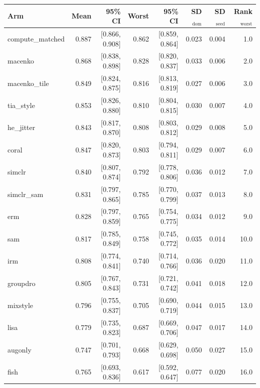 \begin{tabular}{lrrrrrrr}
\toprule
Arm & Mean & 95\% CI & Worst & 95\% CI & SD$_\text{dom}$ & SD$_\text{seed}$ & Rank$_\text{worst}$ \\
\midrule
compute\_matched & 0.887 & [0.866, 0.908] & 0.862 & [0.859, 0.864] & 0.023 & 0.004 & 1.0 \\
macenko & 0.868 & [0.838, 0.898] & 0.828 & [0.820, 0.837] & 0.033 & 0.006 & 2.0 \\
macenko\_tile & 0.849 & [0.824, 0.875] & 0.816 & [0.813, 0.819] & 0.027 & 0.006 & 3.0 \\
tia\_style & 0.853 & [0.826, 0.880] & 0.810 & [0.804, 0.815] & 0.030 & 0.007 & 4.0 \\
he\_jitter & 0.843 & [0.817, 0.870] & 0.808 & [0.803, 0.812] & 0.029 & 0.008 & 5.0 \\
coral & 0.847 & [0.820, 0.873] & 0.803 & [0.794, 0.811] & 0.029 & 0.007 & 6.0 \\
simclr & 0.840 & [0.807, 0.874] & 0.792 & [0.778, 0.806] & 0.036 & 0.012 & 7.0 \\
simclr\_sam & 0.831 & [0.797, 0.865] & 0.785 & [0.770, 0.799] & 0.037 & 0.013 & 8.0 \\
erm & 0.828 & [0.797, 0.859] & 0.765 & [0.754, 0.775] & 0.034 & 0.012 & 9.0 \\
sam & 0.817 & [0.785, 0.849] & 0.758 & [0.745, 0.772] & 0.035 & 0.014 & 10.0 \\
irm & 0.808 & [0.774, 0.841] & 0.740 & [0.714, 0.766] & 0.036 & 0.020 & 11.0 \\
groupdro & 0.805 & [0.767, 0.843] & 0.731 & [0.721, 0.742] & 0.041 & 0.018 & 12.0 \\
mixstyle & 0.796 & [0.755, 0.837] & 0.705 & [0.690, 0.719] & 0.044 & 0.015 & 13.0 \\
lisa & 0.779 & [0.735, 0.823] & 0.687 & [0.669, 0.706] & 0.047 & 0.017 & 14.0 \\
augonly & 0.747 & [0.701, 0.793] & 0.668 & [0.629, 0.698] & 0.050 & 0.027 & 15.0 \\
fish & 0.765 & [0.693, 0.836] & 0.617 & [0.592, 0.647] & 0.077 & 0.020 & 16.0 \\
\bottomrule
\end{tabular}
